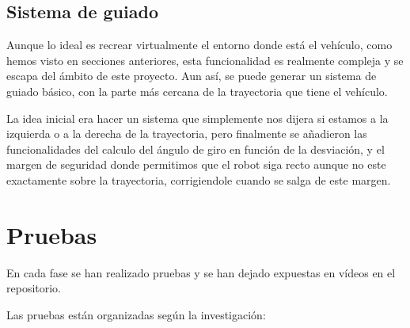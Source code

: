 \subsection{Sistema de guiado}
Aunque lo ideal es recrear virtualmente el entorno donde está el vehículo, como hemos visto en secciones anteriores, esta funcionalidad es realmente compleja y se escapa del ámbito de este proyecto. Aun así, se puede generar un sistema de guiado básico, con la parte más cercana de la trayectoria que tiene el vehículo. 

La idea inicial era hacer un sistema que simplemente nos dijera si estamos a la izquierda o a la derecha de la trayectoria, pero finalmente se añadieron las funcionalidades del calculo del ángulo de giro en función de la desviación, y el margen de seguridad donde permitimos que el robot siga recto aunque no este exactamente sobre la trayectoria, corrigiendole cuando se salga de este margen.

\section{Pruebas}
En cada fase se han realizado pruebas y se han dejado expuestas en vídeos en el repositorio.

Las pruebas están organizadas según la investigación:

